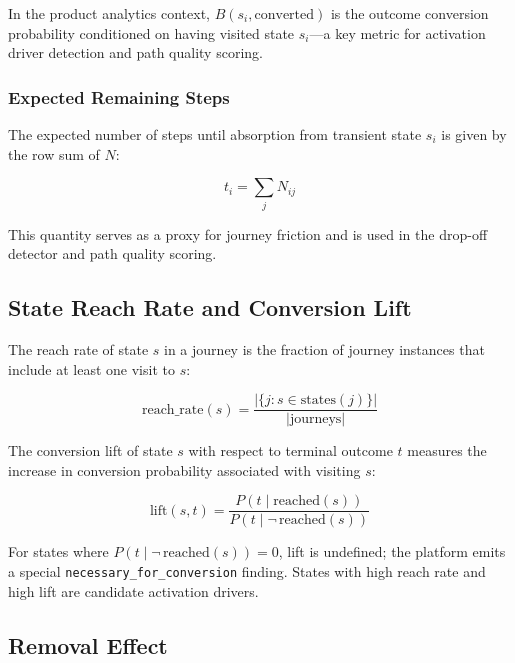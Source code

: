 \documentclass[12pt, a4paper]{article}
\begin{document}
In the product analytics context, $B(s_i, \text{converted})$ is the outcome conversion probability conditioned on having visited state $s_i$---a key metric for activation driver detection and path quality scoring.

\subsubsection{Expected Remaining Steps}

The expected number of steps until absorption from transient state $s_i$ is given by the row sum of $N$:

\begin{equation}
  t_i = \sum_j N_{ij}
  \label{eq:expectedsteps}
\end{equation}

This quantity serves as a proxy for journey friction and is used in the drop-off detector and path quality scoring.

\subsection{State Reach Rate and Conversion Lift}

The reach rate of state $s$ in a journey is the fraction of journey instances that include at least one visit to $s$:

\begin{equation}
  \text{reach\_rate}(s) = \frac{|\{j : s \in \text{states}(j)\}|}{|\text{journeys}|}
  \label{eq:reachrate}
\end{equation}

The conversion lift of state $s$ with respect to terminal outcome $t$ measures the increase in conversion probability associated with visiting $s$:

\begin{equation}
  \text{lift}(s, t) = \frac{P(t \mid \text{reached}(s))}{P(t \mid \neg\,\text{reached}(s))}
  \label{eq:lift}
\end{equation}

For states where $P(t \mid \neg\,\text{reached}(s)) = 0$, lift is undefined; the platform emits a special \texttt{necessary\_for\_conversion} finding. States with high reach rate and high lift are candidate activation drivers.

\subsection{Removal Effect}
\end{document}
